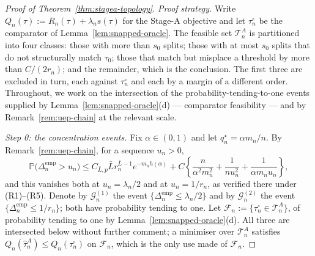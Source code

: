 \documentclass[11pt]{article}
\theoremstyle{plain}
\theoremstyle{definition}
\theoremstyle{remark}
\newcommand{\PP}{\mathbb{P}}
\newcommand{\cT}{\mathcal{T}}
\begin{document}
\begin{proof}[Proof of Theorem~\ref{thm:stagea-topology}]
\emph{Proof strategy.}
Write \(Q_n(\tau):=R_n(\tau)+\lambda_ns(\tau)\) for the Stage-A objective and
let \(\tau_n^\circ\) be the comparator of Lemma~\ref{lem:snapped-oracle}. The
feasible set \(\cT^A_n\) is partitioned into four classes: those with more
than \(s_0\) splits; those with at most \(s_0\) splits that do not
structurally match \(\tau_0\); those that match but misplace a threshold by
more than \(C/(2r_n)\); and the remainder, which is the conclusion. The first
three are excluded in turn, each against \(\tau_n^\circ\) and each by a
margin of a different order. Throughout, we work on the intersection of the
probability-tending-to-one events supplied by
Lemma~\ref{lem:snapped-oracle}(d) --- comparator feasibility --- and by
Remark~\ref{rem:uep-chain} at the relevant scale.

\emph{Step 0: the concentration events.}
Fix \(\alpha\in(0,1)\) and let \(q_n^\star=\alpha m_n/n\). By
Remark~\ref{rem:uep-chain}, for a sequence \(u_n>0\),
\[
  \PP\bigl(\Delta^{\mathrm{emp}}_n>u_n\bigr)
  \le
  C_{\bar L,p}\bar Lr_n^{\bar L-1}e^{-m_nh(\alpha)}
  +C\left\{
    \frac{n}{\alpha^2m_n^2}+\frac1{nu_n^2}+\frac1{\alpha m_nu_n}
  \right\},
\]
and this vanishes both at \(u_n=\lambda_n/2\) and at \(u_n=1/r_n\), as
verified there under (R1)--(R5). Denote by \(\mathcal{G}_n^{(1)}\) the event
\(\{\Delta^{\mathrm{emp}}_n\le\lambda_n/2\}\) and by \(\mathcal{G}_n^{(2)}\) the event
\(\{\Delta^{\mathrm{emp}}_n\le1/r_n\}\); both have probability tending to one.
Let \(\mathcal{F}_n:=\{\tau_n^\circ\in\cT^A_n\}\), of probability tending to one by
Lemma~\ref{lem:snapped-oracle}(d). All three are intersected below without
further comment; a minimiser over \(\cT^A_n\) satisfies
\(Q_n(\hat\tau^A_n)\le Q_n(\tau_n^\circ)\) on \(\mathcal{F}_n\), which is the only use
made of \(\mathcal{F}_n\).


\end{proof}
\end{document}
